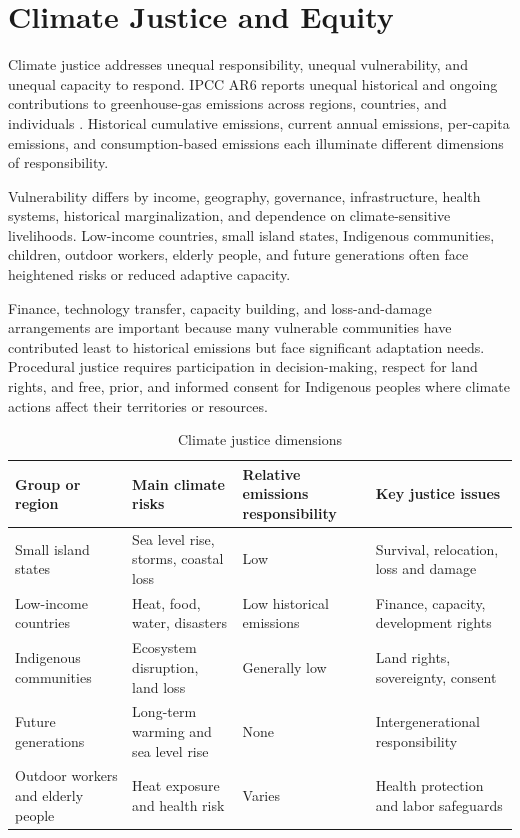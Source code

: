\documentclass[12pt]{article}
\begin{document}
\section{Climate Justice and Equity}

Climate justice addresses unequal responsibility, unequal vulnerability, and unequal capacity to respond. IPCC AR6 reports unequal historical and ongoing contributions to greenhouse-gas emissions across regions, countries, and individuals \cite{ref1}. Historical cumulative emissions, current annual emissions, per-capita emissions, and consumption-based emissions each illuminate different dimensions of responsibility.

Vulnerability differs by income, geography, governance, infrastructure, health systems, historical marginalization, and dependence on climate-sensitive livelihoods. Low-income countries, small island states, Indigenous communities, children, outdoor workers, elderly people, and future generations often face heightened risks or reduced adaptive capacity.

Finance, technology transfer, capacity building, and loss-and-damage arrangements are important because many vulnerable communities have contributed least to historical emissions but face significant adaptation needs. Procedural justice requires participation in decision-making, respect for land rights, and free, prior, and informed consent for Indigenous peoples where climate actions affect their territories or resources.

\begin{table}[htbp]
\centering
\caption{Climate justice dimensions}
\begin{tabularx}{\textwidth}{p{3.2cm}Yp{3cm}Y}
\toprule
Group or region & Main climate risks & Relative emissions responsibility & Key justice issues \\
\midrule
Small island states & Sea level rise, storms, coastal loss & Low & Survival, relocation, loss and damage \\
Low-income countries & Heat, food, water, disasters & Low historical emissions & Finance, capacity, development rights \\
Indigenous communities & Ecosystem disruption, land loss & Generally low & Land rights, sovereignty, consent \\
Future generations & Long-term warming and sea level rise & None & Intergenerational responsibility \\
Outdoor workers and elderly people & Heat exposure and health risk & Varies & Health protection and labor safeguards \\
\bottomrule
\end{tabularx}
\end{table}
\end{document}
